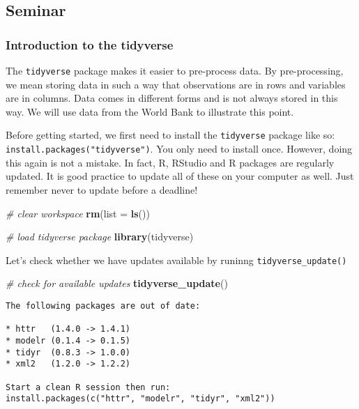 \documentclass[]{article}
\newenvironment{Shaded}{\begin{snugshade}}{\end{snugshade}}
\newcommand{\CommentTok}[1]{\textcolor[rgb]{0.56,0.35,0.01}{\textit{#1}}}
\newcommand{\DataTypeTok}[1]{\textcolor[rgb]{0.13,0.29,0.53}{#1}}
\newcommand{\KeywordTok}[1]{\textcolor[rgb]{0.13,0.29,0.53}{\textbf{#1}}}
\newcommand{\NormalTok}[1]{#1}
\begin{document}
\hypertarget{seminar}{%
\subsection{Seminar}\label{seminar}}

\hypertarget{introduction-to-the-tidyverse}{%
\subsubsection{Introduction to the tidyverse}\label{introduction-to-the-tidyverse}}

The \texttt{tidyverse} package makes it easier to pre-process data. By pre-processing, we mean storing data in such a way that observations are in rows and variables are in columns. Data comes in different forms and is not always stored in this way. We will use data from the World Bank to illustrate this point.

Before getting started, we first need to install the \texttt{tidyverse} package like so: \texttt{install.packages("tidyverse")}. You only need to install once. However, doing this again is not a mistake. In fact, R, RStudio and R packages are regularly updated. It is good practice to update all of these on your computer as well. Just remember never to update before a deadline!

\begin{Shaded}
\begin{Highlighting}[]
\CommentTok{# clear workspace}
\KeywordTok{rm}\NormalTok{(}\DataTypeTok{list =} \KeywordTok{ls}\NormalTok{())}

\CommentTok{# load tidyverse package}
\KeywordTok{library}\NormalTok{(tidyverse)}
\end{Highlighting}
\end{Shaded}

Let's check whether we have updates available by runinng \texttt{tidyverse\_update()}

\begin{Shaded}
\begin{Highlighting}[]
\CommentTok{# check for available updates}
\KeywordTok{tidyverse_update}\NormalTok{()}
\end{Highlighting}
\end{Shaded}

\begin{verbatim}
The following packages are out of date:
  
* httr   (1.4.0 -> 1.4.1)
* modelr (0.1.4 -> 0.1.5)
* tidyr  (0.8.3 -> 1.0.0)
* xml2   (1.2.0 -> 1.2.2)

Start a clean R session then run:
install.packages(c("httr", "modelr", "tidyr", "xml2"))
\end{verbatim}
\end{document}
